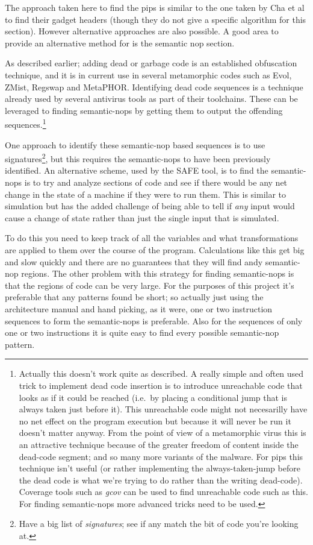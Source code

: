 \documentclass[]{book}
\begin{document}
The approach taken here to find the pips is similar to the one taken by
Cha et al\autocite{Cha:2010uh} to find their gadget headers (though they
do not give a specific algorithm for this section). However alternative
approaches are also possible. A good area to provide an alternative
method for is the semantic nop section.

As described earlier; adding dead or garbage code is an established
obfuscation technique, and it is in current use in several metamorphic
codes such as Evol, ZMist, Regswap and
MetaPHOR\autocite{Borello:2008vx}. Identifying dead code sequences is a
technique already used by several antivirus tools as part of their
toolchains. These can be leveraged to finding semantic-nops by getting
them to output the offending sequences.\footnote{Actually this doesn't
  work quite as described. A really simple and often used trick to
  implement dead code insertion is to introduce unreachable code that
  looks as if it could be reached (i.e.~by placing a conditional jump
  that is always taken just before it). This unreachable code might not
  necesarilly have no net effect on the program execution but because it
  will never be run it doesn't matter anyway. From the point of view of
  a metamorphic virus this is an attractive technique because of the
  greater freedom of content inside the dead-code segment; and so many
  more variants of the malware. For pips this technique isn't useful (or
  rather implementing the always-taken-jump before the dead code is what
  we're trying to do rather than the writing dead-code). Coverage tools
  such as \emph{gcov} can be used to find unreachable code such as
  this.\autocite{Administrator:ul} For finding semantic-nops more
  advanced tricks need to be used.}

One approach to identify these semantic-nop based sequences is to use
signatures\footnote{Have a big list of \emph{signatures}; see if any
  match the bit of code you're looking at.}, but this requires the
semantic-nops to have been previously identified. An alternative scheme,
used by the SAFE tool\autocite{Christodorescu:2006vz}, is to find the
semantic-nops is to try and analyze sections of code and see if there
would be any net change in the state of a machine if they were to run
them. This is similar to simulation but has the added challenge of being
able to tell if \emph{any} input would cause a change of state rather
than just the single input that is simulated.

To do this you need to keep track of all the variables and what
transformations are applied to them over the course of the program.
Calculations like this get big and slow quickly and there are no
guarantees that they will find andy semantic-nop regions. The other
problem with this strategy for finding semantic-nops is that the regions
of code can be very large. For the purposes of this project it's
preferable that any patterns found be short; so actually just using the
architecture manual and hand picking, as it were, one or two instruction
sequences to form the semantic-nops is preferable. Also for the
sequences of only one or two instructions it is quite easy to find every
possible semantic-nop pattern.
\end{document}
